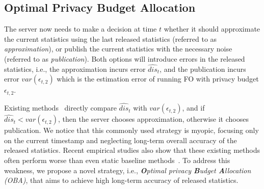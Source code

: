 \documentclass[acmsmall]{acmart}
\newcommand{\hdis}{\hat{\mathit{dis}}}
\newcommand{\var}{\mathit{var}}
\begin{document}



\subsection{Optimal Privacy Budget Allocation}
\label{ss:optimal_budget}

The server now needs to make a decision at time $t$ whether it should
approximate the current statistics using the last released statistics (referred
to as \emph{approximation}), or publish the current statistics with the necessary
noise (referred to as \emph{publication}).
Both options will introduce errors in the released statistics, i.e., the
approximation incurs error $\hdis_t$, and the publication incurs error
$\var(\epsilon_{t,2})$ which is the estimation error of running FO with privacy
budget $\epsilon_{t,2}$.

Existing methods~\cite{Kellaris2014,Ren2022} directly compare $\hdis_t$ with
$\var(\epsilon_{t,2})$, and if
$\hdis_t<\var(\epsilon_{t,2})$, then the server chooses approximation, otherwise it chooses
publication.
We notice that this commonly used strategy is myopic, focusing only on the current
timestamp and neglecting long-term overall accuracy of the released
statistics.
Recent empirical studies also show that these existing methods often perform
worse than even static baseline methods~\cite{Schaler2024}.
To address this weakness, we propose a novel strategy, i.e.,
\emph{\textbf{O}ptimal privacy \textbf{B}udget \textbf{A}llocation (OBA)}, that
aims to achieve high long-term accuracy of released statistics.
\end{document}
